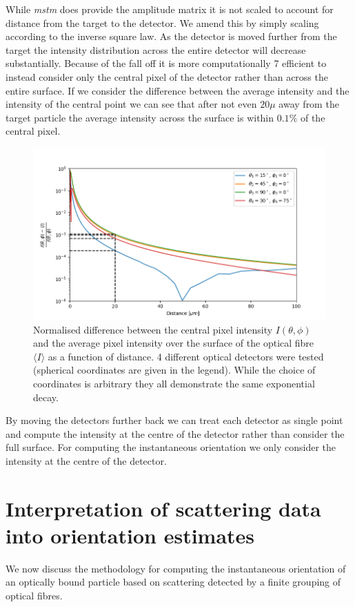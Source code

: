 While \textit{mstm} does provide the amplitude matrix it is not
scaled to account for distance from the target to the detector.
We amend this by simply scaling according to the inverse square 
law. As the detector is moved further from the target the 
intensity distribution across the entire detector will decrease
substantially. Because of the fall off it is more computationally 7
efficient to instead consider only the central pixel of the 
detector rather than across the entire surface. If we consider 
the difference between the average intensity and the intensity 
of the central point we can see that after not even $20 \mu$ 
away from the target particle the average intensity across the 
surface is within $0.1\%$ of the central pixel. 
\begin{figure}[h!]
	\centering
	\includegraphics[width=\linewidth]{fall_off_with_distance.png}
	\caption{Normalised difference between the central pixel intensity
	$I(\theta, \phi)$ and the average pixel intensity over the surface
	of the optical fibre $\langle I \rangle$ as a function of distance.
	4 different optical detectors were tested (spherical coordinates 
	are given in the legend). While the choice of coordinates is 
	arbitrary they all demonstrate the same exponential decay.}
\end{figure}

By moving the detectors further back we can treat each detector 
as single point and compute the intensity at the centre of the 
detector rather than consider the full surface. For computing 
the instantaneous orientation we only consider the intensity 
at the centre of the detector.

\section{Interpretation of scattering data into orientation estimates}
We now discuss the methodology for computing the instantaneous 
orientation of an optically bound particle based on scattering
detected by a finite grouping of optical fibres. 

